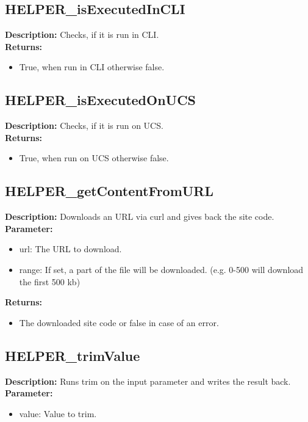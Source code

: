 \subsection{HELPER\_isExecutedInCLI}
\textbf{Description:} Checks, if it is run in CLI.\\
\textbf{Returns:}
\begin{itemize}
\item True, when run in CLI otherwise false.
\end{itemize}

\subsection{HELPER\_isExecutedOnUCS}
\textbf{Description:} Checks, if it is run on UCS.\\
\textbf{Returns:}
\begin{itemize}
\item True, when run on UCS otherwise false.
\end{itemize}

\subsection{HELPER\_getContentFromURL}
\textbf{Description:} Downloads an URL via curl and gives back the site code.\\
\textbf{Parameter:}
\begin{itemize}
\item url: The URL to download.
\item range: If set, a part of the file will be downloaded. (e.g. 0-500 will download the first 500 kb)
\end{itemize}
\textbf{Returns:}
\begin{itemize}
\item The downloaded site code or false in case of an error.
\end{itemize}

\subsection{HELPER\_trimValue}
\textbf{Description:} Runs trim on the input parameter and writes the result back.\\
\textbf{Parameter:}
\begin{itemize}
\item value: Value to trim.
\end{itemize}

